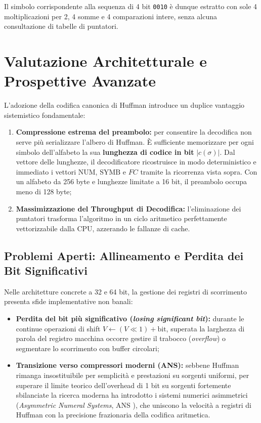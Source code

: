 Il simbolo corrispondente alla sequenza di 4 bit \texttt{0010} \`e dunque estratto con sole 4 moltiplicazioni per 2, 4 somme e 4 comparazioni intere, senza alcuna consultazione di tabelle di puntatori.

\FloatBarrier
\section{Valutazione Architetturale e Prospettive Avanzate}
\label{sec:valutazione-prospettive}

L'adozione della codifica canonica di Huffman introduce un duplice vantaggio sistemistico fondamentale:
\begin{enumerate}
  \item \textbf{Compressione estrema del preambolo:} per consentire la decodifica non serve pi\`u serializzare l'albero di Huffman. \`E sufficiente memorizzare per ogni simbolo dell'alfabeto la sua \textbf{lunghezza di codice in bit} $\vert c(\sigma) \vert$. Dal vettore delle lunghezze, il decodificatore ricostruisce in modo deterministico e immediato i vettori $\text{NUM}$, $\text{SYMB}$ e $FC$ tramite la ricorrenza vista sopra. Con un alfabeto da 256 byte e lunghezze limitate a 16 bit, il preambolo occupa meno di 128 byte;
  \item \textbf{Massimizzazione del Throughput di Decodifica:} l'eliminazione dei puntatori trasforma l'algoritmo in un ciclo aritmetico perfettamente vettorizzabile dalla CPU, azzerando le fallanze di cache.
\end{enumerate}

\FloatBarrier
\subsection{Problemi Aperti: Allineamento e Perdita dei Bit Significativi}
\label{subsec:problemi-aperti-ans}

Nelle architetture concrete a 32 e 64 bit, la gestione dei registri di scorrimento presenta sfide implementative non banali:
\begin{itemize}
  \item \textbf{Perdita del bit pi\`u significativo (\textit{losing significant bit}):} durante le continue operazioni di shift $V \leftarrow (V \ll 1) + \text{bit}$, superata la larghezza di parola del registro macchina occorre gestire il trabocco (\textit{overflow}) o segmentare lo scorrimento con buffer circolari;
  \item \textbf{Transizione verso compressori moderni (ANS):} sebbene Huffman rimanga insostituibile per semplicit\`a e prestazioni su sorgenti uniformi, per superare il limite teorico dell'overhead di 1 bit su sorgenti fortemente sbilanciate la ricerca moderna ha introdotto i sistemi numerici asimmetrici (\textit{Asymmetric Numeral Systems}, ANS \cite{duda2009}), che uniscono la velocit\`a a registri di Huffman con la precisione frazionaria della codifica aritmetica.
\end{itemize}
